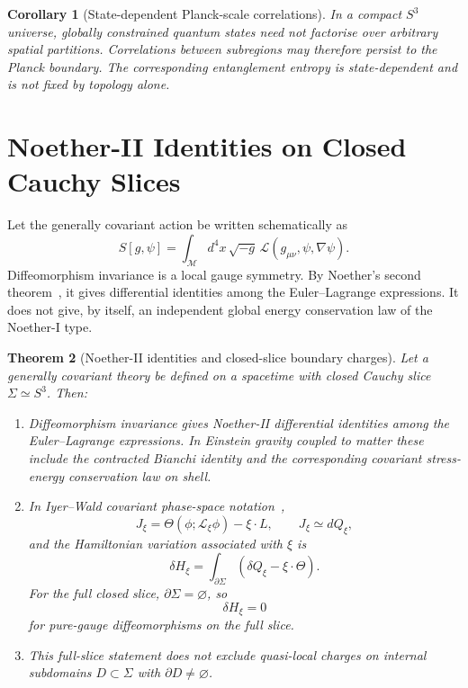 \documentclass[reprint,aps,prd,letterpaper,superscriptaddress,nofootinbib,longbibliography,floatfix]{revtex4-2}
\newtheorem{theorem}{Theorem}[section]
\newtheorem{corollary}[theorem]{Corollary}
\theoremstyle{remark}
\begin{document}
\begin{corollary}[State-dependent Planck-scale correlations]
In a compact \(S^3\) universe, globally constrained quantum states need not
factorise over arbitrary spatial partitions.  Correlations between subregions
may therefore persist to the Planck boundary.  The corresponding entanglement
entropy is state-dependent and is not fixed by topology alone.
\end{corollary}

\section{Noether-II Identities on Closed Cauchy Slices}

Let the generally covariant action be written schematically as
\[
  S[g,\psi]=\int_{\mathcal M}d^4x\,\sqrt{-g}\,
  \mathcal L(g_{\mu\nu},\psi,\nabla\psi).
\]
Diffeomorphism invariance is a local gauge symmetry.  By Noether's second
theorem~\cite{Noether}, it gives differential identities among the Euler--Lagrange
expressions.  It does not give, by itself, an independent global energy
conservation law of the Noether-I type.

\begin{theorem}[Noether-II identities and closed-slice boundary charges]
\label{thm:noether}
Let a generally covariant theory be defined on a spacetime with closed Cauchy
slice \(\Sigma\simeq S^3\).  Then:
\begin{enumerate}
\item Diffeomorphism invariance gives Noether-II differential identities among
the Euler--Lagrange expressions.  In Einstein gravity coupled to matter these
include the contracted Bianchi identity and the corresponding covariant
stress-energy conservation law on shell.
\item In Iyer--Wald covariant phase-space notation~\cite{IyerWald},
\[
  J_\xi=\Theta(\phi;\mathcal L_\xi\phi)-\xi\cdot L,
  \qquad
  J_\xi\simeq dQ_\xi ,
\]
and the Hamiltonian variation associated with \(\xi\) is
\[
  \delta H_\xi
  =\int_{\partial\Sigma}
  \left(\delta Q_\xi-\xi\cdot\Theta\right).
\]
For the full closed slice, \(\partial\Sigma=\varnothing\), so
\[
  \delta H_\xi=0
\]
for pure-gauge diffeomorphisms on the full slice.
\item This full-slice statement does not exclude quasi-local charges on internal
subdomains \(D\subset\Sigma\) with \(\partial D\ne\varnothing\).
\end{enumerate}
\end{theorem}
\end{document}
